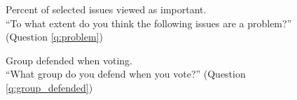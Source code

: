 \documentclass[12pt,english]{article}
\begin{document}
\begin{figure}[h!]
    \caption[Importance of selected issues]{Percent of selected issues viewed as important.\\ ``To what extent do you think the following issues are a problem?'' (Question \ref{q:problem})}\label{fig:problem}
\end{figure}

\begin{figure}[h!]
    \caption[Group defended when voting]{Group defended when voting. \\ ``What group do you defend when you vote?'' (Question \ref{q:group_defended})}\label{fig:group_defended}
\end{figure}
\end{document}
